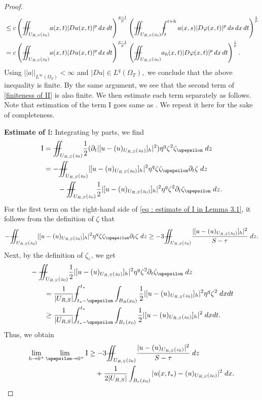 \documentclass[11pt,oneside, english,reqno,twoside a4paper]{amsart}
\theoremstyle{definition}
\numberwithin{theorem}{section}
\numberwithin{equation}{section}
\def\Xint#1{\mathchoice
	{\XXint\displaystyle\textstyle{#1}}%
	{\XXint\textstyle\scriptstyle{#1}}%
	{\XXint\scriptstyle\scriptscriptstyle{#1}}%
	{\XXint\scriptscriptstyle\scriptscriptstyle{#1}}%
	\!\int}
\def\XXint#1#2#3{{\setbox0=\hbox{$#1{#2#3}{\int}$}
		\vcenter{\hbox{$#2#3$}}\kern-.50\wd0}}
\def\dashint{\Xint-}
\newcommand{\iintss}{{\int\hspace{-0.28cm}\int}}
\newcommand{ \miints }{{\iintss\hspace{-0.56cm} -\hspace{-0.15cm}-}}
\newcommand{\miint}[1]{{\miints_{\hspace{-0.13cm}#1}}}
\begin{document}
\begin{proof}
\begin{align*}
&\leq c \left(\miint{U_{R,S}(z_0)}a(x,t)|Du(x,t)|^p\,dx\,dt\right)^{\frac{p-1}{p}}\left(\miint{U_{R,S}(z_0)}\dashint_{t}^{t+h}a(x,s)|D \varphi(x,t)|^p\,ds\,dx\,dt\right)^{\frac{1}{p}}\\
&=c \left(\miint{U_{R,S}(z_0)}a(x,t)|Du(x,t)|^p\,dx\,dt\right)^{\frac{p-1}{p}}\left(\miint{U_{R,S}(z_0)}a_h(x,t)|D \varphi(x,t)|^p\,dx\,dt\right)^{\frac{1}{p}}.
\end{align*}
Using $||a||_{L^{\infty}(\Omega_T)}<\infty$ and $|Du|\in L^q(\Omega_T),$ we conclude that the above inequality is finite. By the same argument, we see that the second term of \eqref{finiteness of II} is also finite. We then estimate each term separately as follows. Note that estimation of the term $\mathrm{I}$ goes same as \cite[Lemma 2.3]{2023_Gradient_Higher_Integrability_for_Degenerate_Parabolic_Double-Phase_Systems}. We repeat it here for the sake of completeness.

\noindent \textbf{Estimate of $\mathrm{I}$:} Integrating by parts, we find 
    \begin{align}\nonumber
        \mathrm{I}&=\miint{U_{R,S}(z_0)} \frac{1}{2}(\partial_t |[u-(u)_{U_{R, S}(z_0)}]_h|^2)\eta^q\zeta^2\zeta_\upepsilon \; dz\\\label{eq : estimate of I in Lemma 3.1}
        &=-\miint{U_{R,S}(z_0)} |[u-(u)_{U_{R, S}(z_0)}]_h|^2\eta^q\zeta\zeta_\upepsilon\partial_t\zeta \;dz\\\nonumber
        &\qquad-\miint{U_{R,S}(z_0)} \frac{1}{2}|[u-(u)_{U_{R, S}(z_0)}]_h|^2 \eta^q \zeta^2 \partial_t\zeta_\upepsilon \; dz.
    \end{align}
    For the first term on the right-hand side of \eqref{eq : estimate of I in Lemma 3.1}, it follows from the definition of $\zeta$ that
    $$
    -\miint{U_{R,S}(z_0)} |[u-(u)_{U_{R, S}(z_0)}]_h|^2\eta^q\zeta\zeta_\upepsilon\partial_t\zeta \;dz\geq -3 \miint{U_{R,S}(z_0)}\frac{|[u-(u)_{U_{R,S}(z_0)}]_h|^2}{S-\tau} \; dz.
    $$
    Next, by the definition of $\zeta_\upepsilon$, we get 
    \begin{align*}
        &-\miint{U_{R,S}(z_0)} \frac{1}{2} |[u-(u)_{U_{R, S}(z_0)}]_h|^2 \eta^q \zeta^2 \partial_t\zeta_\upepsilon \; dz\\
        &\qquad =\frac{1}{|U_{R, S}|}\dashint_{t_*-\upepsilon}^{t_*}\int_{B_R(x_0)}\frac{1}{2} |[u-(u)_{U_{R, S}(z_0)}]_h|^2 \eta^q \zeta^2 \;dx dt\\
        &\qquad \geq \frac{1}{|U_{R, S}|}\dashint_{t_*-\upepsilon}^{t_*}\int_{B_r(x_0)} \frac{1}{2} |[u-(u)_{U_{R, S}(z_0)}]_h|^2\; dx dt.
    \end{align*}
    Thus, we obtain
    \begin{equation}\label{eq: final estimate of I in Lemma 3.1}
        \begin{aligned}
            \lim_{h\rightarrow 0^+}\lim_{\upepsilon \rightarrow 0^+} \mathrm{I} &\geq -3 \miint{U_{R,S}(z_0)}\frac{|u-(u)_{U_{R,S}(z_0)}|^2}{S-\tau} \; dz\\
            &\quad +\frac{1}{2|U_{R,S}|}\int_{B_r(x_0)} |u(x,t_*)-(u)_{U_{R, S}(z_0)}|^2\; dx.
        \end{aligned}
    \end{equation}


\end{proof}
\end{document}
